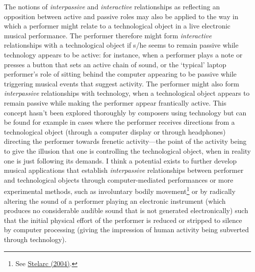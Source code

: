 The notions of \emph{interpassive} and \emph{interactive} relationships as reflecting an opposition between active and passive roles may also be applied to the way in which a performer might relate to a technological object in a live electronic musical performance. The performer therefore might form \emph{interactive} relationships with a technological object if s/he seems to remain passive while technology appears to be active: for instance, when a performer plays a note or presses a button that sets an active chain of sound, or the `typical' laptop performer's role of sitting behind the computer appearing to be passive while triggering musical events that suggest activity. The performer might also form \emph{interpassive} relationships with technology, when a technological object appears to remain passive while making the performer appear frantically active. This concept hasn't been explored thoroughly by composers using technology but can be found for example in cases where the performer receives directions from a technological object (through a computer display or through headphones) directing the performer towards frenetic activity---the point of the activity being to give the illusion that one is controlling the technological object, when in reality one is just following its demands. I think a potential exists to further develop musical applications that establish \emph{interpassive} relationships between performer and technological objects through computer-mediated performances or more experimental methods, such as involuntary bodily movement\footnote{See \hyperlink{stelarc}{Stelarc (2004)}.} or by radically altering the sound of a performer playing an electronic instrument (which produces no considerable audible sound that is not generated electronically) such that the initial physical effort of the performer is reduced or stripped to silence by computer processing (giving the impression of human activity being subverted through technology). 


